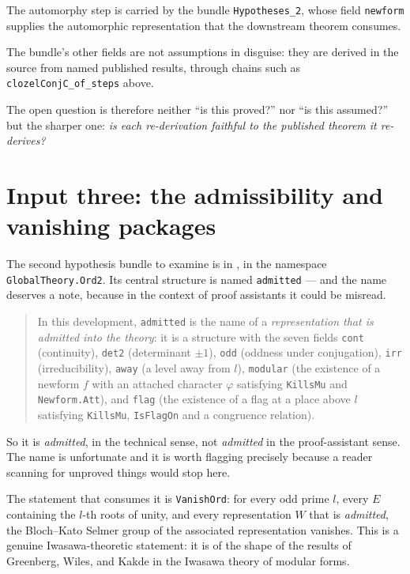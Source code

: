 \begin{keytakeaways}

\item The automorphy step is carried by the bundle \texttt{Hypotheses\_2},
whose field \texttt{newform} supplies the automorphic representation that the
downstream theorem consumes.
\item The bundle's other fields are not assumptions in disguise: they are
derived in the source from named published results, through chains such as
\texttt{clozelConjC\_of\_steps} above.
\item The open question is therefore neither ``is this proved?'' nor ``is this
assumed?'' but the sharper one: \emph{is each re-derivation faithful to the
published theorem it re-derives?}
\end{keytakeaways}

\section{Input three: the admissibility and vanishing packages}The second hypothesis bundle to examine is in
,
in the namespace \texttt{GlobalTheory.Ord2}. Its central structure is named
\texttt{admitted} --- and the name deserves a note, because in the context of
proof assistants it could be misread.

\begin{quote}
In this development, \texttt{admitted} is the name of a \emph{representation
that is admitted into the theory}: it is a structure with the seven fields
\texttt{cont} (continuity), \texttt{det2} (determinant $\pm 1$), \texttt{odd}
(oddness under conjugation), \texttt{irr} (irreducibility), \texttt{away}
(a level away from $l$), \texttt{modular} (the existence of a newform $f$ with
an attached character $\varphi$ satisfying \texttt{KillsMu} and
\texttt{Newform.Att}), and \texttt{flag} (the existence of a flag at a place
above $l$ satisfying \texttt{KillsMu}, \texttt{IsFlagOn} and a congruence
relation).
\end{quote}

So it is \emph{admitted}, in the technical sense, not \emph{admitted} in the
proof-assistant sense. The name is unfortunate and it is worth flagging
precisely because a reader scanning for unproved things would stop here.

The statement that consumes it is \texttt{VanishOrd}: for every odd prime $l$,
every $E$ containing the $l$-th roots of unity, and every representation $W$
that is \emph{admitted}, the Bloch--Kato Selmer group of the associated
representation vanishes. This is a genuine Iwasawa-theoretic statement: it is
of the shape of the results of Greenberg, Wiles, and Kakde in the Iwasawa
theory of modular forms.

